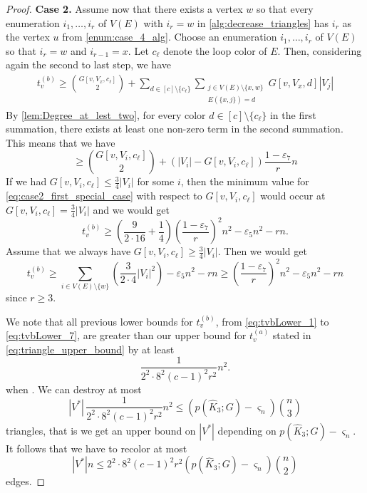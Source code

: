 \documentclass[a4paper,11pt]{article}
\numberwithin{equation}{section}
\newcommand{\whiteboxedchar}[1]{
    \hspace{-2pt}\tikz[baseline=(char.base)]{
        \node[shape=rectangle, draw=black, thin, rounded corners=1.5pt, text=black, inner xsep=3pt, inner ysep=2pt] (char) {#1};
    }\hspace{-2pt}
}
\begin{document}
\begin{proof}
    \medskip
    \noindent \textbf{Case 2. }   Assume now that there exists a vertex $w$ so that every enumeration $i_1,\dots,i_r$ of $V(E)$ with $i_r=w$ in \cref{alg:decrease_triangles} has $i_r$ as the vertex $u$ from \cref{enum:case_4_alg}. Choose an enumeration $i_1,\dots,i_r$ of $V(E)$ so that $i_r = w$ and $i_{r-1}=x$. Let $c_\ell$ denote the loop color of $E$. Then, considering again the second to last step, we have
\begin{align*}
    t_v^{(b)} \ge \binom{G[v,V_x,c_\ell]}{2} + \sum_{d\in [c]\setminus \{c_\ell\}}
    \sum_{\substack{j\in V(E)\setminus\{x,w\} \\ E(\{x,j\})=d}}
    G[v,V_x,d]|V_j|
\end{align*}
By \cref{lem:Degree_at_lest_two}, for every color $d\in [c]\setminus \{c_\ell\}$ in the first summation, there exists at least one non-zero term in the second summation. This means that we have
\begin{equation}\label{eq:case2_first_special_case}
    \ge \binom{G[v,V_i,c_\ell]}{2} + (|V_i|-G[v,V_i,c_\ell])\frac{1-\varepsilon_7}{r}n
\end{equation}
If we had $G[v,V_i,c_\ell] \le \frac{3}{4}|V_i|$ for some $i$, then the minimum value for \cref{eq:case2_first_special_case} with respect to $G[v,V_i,c_\ell]$ would occur at $G[v,V_i,c_\ell] = \frac{3}{4}|V_i|$ and we would get 
\begin{equation} \label{eq:tvbLower_6}
    t^{(b)}_v\ge \left(\frac{9}{2\cdot 16} + \frac{1}{4}\right)\left(\frac{1-\varepsilon_7}{r}\right)^2n^2
     -\varepsilon_5 n^2 -rn.
\end{equation}
Assume that we always have $G[v,V_i,c_\ell] \ge \frac{3}{4}|V_i|$. Then we would get
%
\begin{equation} \label{eq:tvbLower_7}
    t_v^{(b)} \ge \sum_{i\in V(E)\setminus \{w\}}\left( \frac{3}{2\cdot 4}|V_i|^2\right)
    -\varepsilon_5 n^2 -rn
     \ge \left(\frac{1-\varepsilon_7}{r}\right)^2n^2
     -\varepsilon_5 n^2 -rn
\end{equation}
%
since $r \geq 3$.

\medskip

We note that all previous lower bounds for $t_v^{(b)}$, from \cref{eq:tvbLower_1} to \cref{eq:tvbLower_7}, are greater than our upper bound for $t_v^{(a)}$ stated in \cref{eq:triangle_upper_bound} by at least
\begin{equation*}
    \frac{1}{2^2\cdot 8^2(c-1)^2r^2}n^2.
\end{equation*}
when \whiteboxedchar{$\varepsilon_5$ and $\varepsilon_7$ are sufficiently small}.
We can destroy at most 
\begin{equation*}
    |V^*| \, \frac{1}{2^2\cdot 8^2(c-1)^2r^2}n^2 \le (p(\hat K_3; G)-\varsigma_n)\binom{n}{3}
\end{equation*}
triangles, that is we get an upper bound on $|V^\ast|$ depending on $p(\hat K_3; G)-\varsigma_n$. It follows that we have to recolor  at most
\begin{equation*}
    |V^*|n \le 2^2\cdot 8^2(c-1)^2r^2(p(\hat K_3; G)-\varsigma_n)\binom{n}{2}
\end{equation*}
edges.
\end{proof}
\end{document}
